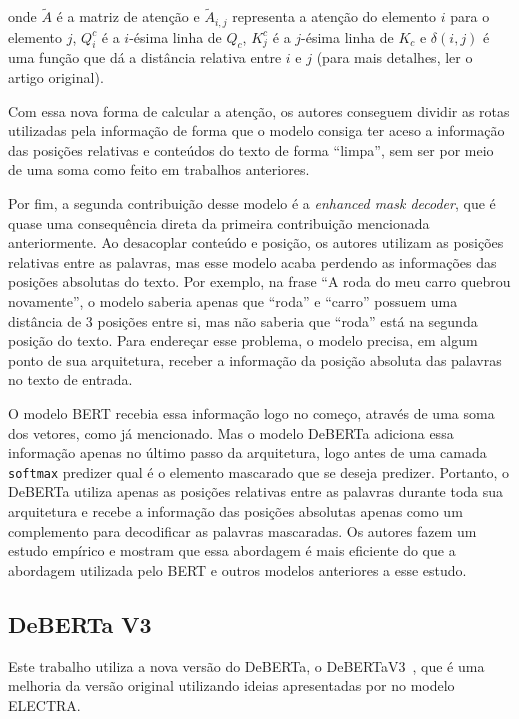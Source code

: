 onde $\tilde{A}$ é a matriz de atenção e $\tilde{A}_{i,j}$ representa a atenção
do elemento $i$ para o elemento $j$, $Q^{c}_i$ é a $i$-ésima linha de $Q_c$,
$K^{c}_j$ é a $j$-ésima linha de $K_c$ e $\delta(i,j)$ é uma função que dá a
distância relativa entre $i$ e $j$ (para mais detalhes, ler o artigo original).

Com essa nova forma de calcular a atenção, os autores conseguem dividir as rotas
utilizadas pela informação de forma que o modelo consiga ter aceso a informação
das posições relativas e conteúdos do texto de forma ``limpa'', sem ser por meio
de uma soma como feito em trabalhos anteriores.

Por fim, a segunda contribuição desse modelo é a \textit{enhanced mask decoder},
que é quase uma consequência direta da primeira contribuição mencionada
anteriormente. Ao desacoplar conteúdo e posição, os autores utilizam as posições
relativas entre as palavras, mas esse modelo acaba perdendo as informações das
posições absolutas do texto. Por exemplo, na frase ``A roda do meu carro quebrou
novamente'', o modelo saberia apenas que ``roda'' e ``carro'' possuem uma
distância de 3 posições entre si, mas não saberia que ``roda'' está na segunda
posição do texto. Para endereçar esse problema, o modelo precisa, em algum ponto
de sua arquitetura, receber a informação da posição absoluta das palavras no
texto de entrada.

O modelo BERT recebia essa informação logo no começo, através de uma soma dos
vetores, como já mencionado. Mas o modelo DeBERTa adiciona essa informação
apenas no último passo da arquitetura, logo antes de uma camada
\texttt{softmax} predizer qual é o elemento mascarado que se deseja predizer.
Portanto, o DeBERTa utiliza apenas as posições relativas entre as palavras
durante toda sua arquitetura e recebe a informação das posições absolutas apenas
como um complemento para decodificar as palavras mascaradas. Os autores fazem um
estudo empírico e mostram que essa abordagem é mais eficiente do que a abordagem
utilizada pelo BERT e outros modelos anteriores a esse estudo.

\subsection{DeBERTa V3}%
\label{sub:deberta_v3}

Este trabalho utiliza a nova versão do DeBERTa, o
DeBERTaV3~\cite{he-etal:2021:debertav3}, que é uma melhoria da versão original
utilizando ideias apresentadas por \cite{clark-etal:2020:electra} no modelo
ELECTRA.

